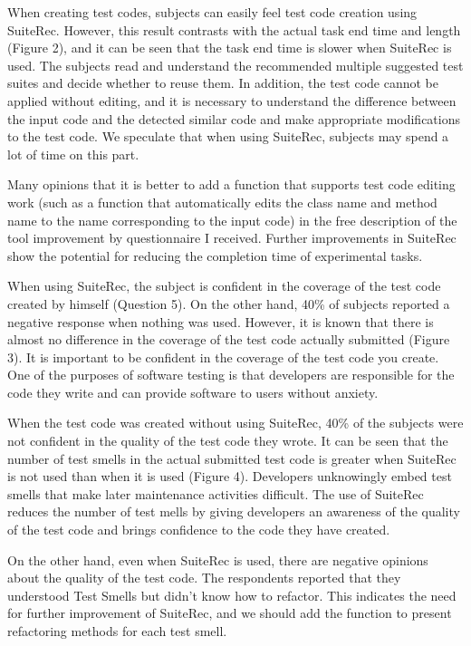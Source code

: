 \documentclass[conference]{IEEEtran}
\begin{document}
When creating test codes, subjects can easily feel test code creation using SuiteRec. However, this result contrasts with the actual task end time and length (Figure 2), and it can be seen that the task end time is slower when SuiteRec is used. The subjects read and understand the recommended multiple suggested test suites and decide whether to reuse them. In addition, the test code cannot be applied without editing, and it is necessary to understand the difference between the input code and the detected similar code and make appropriate modifications to the test code. We speculate that when using SuiteRec, subjects may spend a lot of time on this part. 

Many opinions that it is better to add a function that supports test code editing work (such as a function that automatically edits the class name and method name to the name corresponding to the input code) in the free description of the tool improvement by questionnaire I received. Further improvements in SuiteRec show the potential for reducing the completion time of experimental tasks.

When using SuiteRec, the subject is confident in the coverage of the test code created by himself (Question 5). On the other hand, 40\% of subjects reported a negative response when nothing was used. However, it is known that there is almost no difference in the coverage of the test code actually submitted (Figure 3). It is important to be confident in the coverage of the test code you create. One of the purposes of software testing is that developers are responsible for the code they write and can provide software to users without anxiety.

When the test code was created without using SuiteRec, 40\% of the subjects were not confident in the quality of the test code they wrote. It can be seen that the number of test smells in the actual submitted test code is greater when SuiteRec is not used than when it is used (Figure 4). Developers unknowingly embed test smells that make later maintenance activities difficult. The use of SuiteRec reduces the number of test mells by giving developers an awareness of the quality of the test code and brings confidence to the code they have created.

On the other hand, even when SuiteRec is used, there are negative opinions about the quality of the test code. The respondents reported that they understood Test Smells but didn't know how to refactor. This indicates the need for further improvement of SuiteRec, and we should add the function to present refactoring methods for each test smell.
\end{document}
